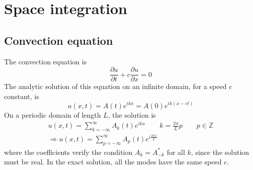 \documentclass[12pt, openany]{report}
\newcommand{\Z}{\mathbb{Z}}
\theoremstyle{definition}
\begin{document}
\chapter{Space integration}
\section{Convection equation}
The convection equation is 
\begin{equation}
	\frac{\partial u}{\partial t} + c \frac{\partial u}{\partial x}=0
\end{equation}
The analytic solution of this equation on an infinite domain, for a speed $c$ constant, is 
\begin{equation}
	u(x,t) = A(t)e^{ikx} = A(0)e^{ik(x-ct)}
\end{equation}
On a periodic domain of length $L$, the solution is 
\begin{equation}
	\begin{aligned}
		u(x,t) = \sum_{k=-\infty}^\infty A_k(t)e^{ikx}\qquad k=\frac{2\pi}{L}p \qquad p\in \Z\\
		\Longrightarrow u(x,t) = \sum_{p=-\infty}^\infty A_p(t) e^{i\frac{2\pi x}{L}}
	\end{aligned}
\end{equation}
where the coefficients verify the condition $A_k = A_{-k}^*$ for all $k$, since the solution must be real. In the exact solution, all the modes have the same speed $c$. 
\end{document}
